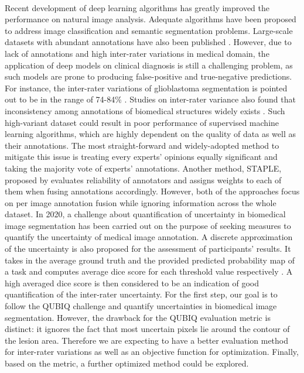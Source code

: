 \documentclass[12pt]{extarticle}
\begin{document}
\paragraph{}
Recent development of deep learning algorithms has greatly improved 
the performance on natural image analysis. 
Adequate algorithms have been proposed to address image classification and semantic
segmentation problems. Large-scale datasets with abundant annotations have also been
published \cite{nair_precup_arnold_arbel_2020}.
However, due to
lack of annotations and high inter-rater variations\cite{zhang2020disentangling}
in medical domain, the application of deep models on clinical diagnosis is still a challenging problem, as such models are prone to producing false-positive and true-negative predictions.
For instance, the inter-rater variations of glioblastoma segmentation
is pointed out to be in the range of 74-84\% \cite{6975210}.
Studies on inter-rater variance also found that
inconsistency among annotations of biomedical structures widely exists
\cite{Variability2019}\cite{interobserver2018}. Such high-variant dataset 
could result in poor performance of supervised machine learning algorithms,
which are highly dependent on the quality of data as well as their annotations.
The most straight-forward and widely-adopted method to mitigate this issue is treating every experts' opinions equally significant\cite{6975210} and taking the majority vote of experts' annotations. Another method, STAPLE, proposed by \cite{STAPLE} 
evaluates reliability of annotators and assigns weights to each of them when fusing annotations accordingly. However, both of the approaches focus on per image annotation fusion
while ignoring information across the whole dataset\cite{zhang2020disentangling}. 
In 2020, a challenge about quantification of uncertainty 
in biomedical image segmentation has been carried
out on the purpose of seeking measures to quantify the uncertainty of 
medical image annotation. A discrete approximation of the uncertainty is also proposed for the assessment of participants' results. It
takes in the average ground truth and the provided predicted probability map of a task
and computes average dice score for each threshold value respectively 
\cite{qubiq}. 
A high averaged dice score is then considered to be an indication of 
good quantification of the inter-rater uncertainty.
For the first step, our goal is to follow the QUBIQ challenge and quantify uncertainties in biomedical image segmentation. 
However, the drawback for the QUBIQ evaluation metric is distinct: it 
ignores the fact that most uncertain pixels lie around 
the contour of the lesion area. Therefore we are expecting to have a
better evaluation method for inter-rater variations as well as an objective function for 
optimization. Finally, based on the metric, a further
optimized method could be explored.
\end{document}
